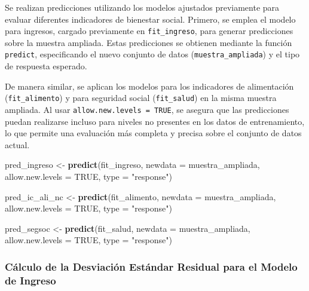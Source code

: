 \documentclass[
  12pt,
]{book}
\newenvironment{Shaded}{\begin{snugshade}}{\end{snugshade}}
\newcommand{\AttributeTok}[1]{\textcolor[rgb]{0.13,0.29,0.53}{#1}}
\newcommand{\ConstantTok}[1]{\textcolor[rgb]{0.56,0.35,0.01}{#1}}
\newcommand{\FunctionTok}[1]{\textcolor[rgb]{0.13,0.29,0.53}{\textbf{#1}}}
\newcommand{\NormalTok}[1]{#1}
\newcommand{\OtherTok}[1]{\textcolor[rgb]{0.56,0.35,0.01}{#1}}
\newcommand{\StringTok}[1]{\textcolor[rgb]{0.31,0.60,0.02}{#1}}
\begin{document}
Se realizan predicciones utilizando los modelos ajustados previamente para evaluar diferentes indicadores de bienestar social. Primero, se emplea el modelo para ingresos, cargado previamente en \texttt{fit\_ingreso}, para generar predicciones sobre la muestra ampliada. Estas predicciones se obtienen mediante la función \texttt{predict}, especificando el nuevo conjunto de datos (\texttt{muestra\_ampliada}) y el tipo de respuesta esperado.

De manera similar, se aplican los modelos para los indicadores de alimentación (\texttt{fit\_alimento}) y para seguridad social (\texttt{fit\_salud}) en la misma muestra ampliada. Al usar \texttt{allow.new.levels\ =\ TRUE}, se asegura que las predicciones puedan realizarse incluso para niveles no presentes en los datos de entrenamiento, lo que permite una evaluación más completa y precisa sobre el conjunto de datos actual.

\begin{Shaded}
\begin{Highlighting}[]
\NormalTok{pred\_ingreso }\OtherTok{\textless{}{-}} \FunctionTok{predict}\NormalTok{(fit\_ingreso, }
                        \AttributeTok{newdata =}\NormalTok{ muestra\_ampliada,}
                        \AttributeTok{allow.new.levels =} \ConstantTok{TRUE}\NormalTok{, }
                        \AttributeTok{type =} \StringTok{"response"}\NormalTok{)}

\NormalTok{pred\_ic\_ali\_nc }\OtherTok{\textless{}{-}} \FunctionTok{predict}\NormalTok{(fit\_alimento, }
                        \AttributeTok{newdata =}\NormalTok{ muestra\_ampliada,}
                        \AttributeTok{allow.new.levels =} \ConstantTok{TRUE}\NormalTok{, }
                        \AttributeTok{type =} \StringTok{"response"}\NormalTok{)}

\NormalTok{pred\_segsoc }\OtherTok{\textless{}{-}} \FunctionTok{predict}\NormalTok{(fit\_salud, }
                        \AttributeTok{newdata =}\NormalTok{ muestra\_ampliada,}
                       \AttributeTok{allow.new.levels =} \ConstantTok{TRUE}\NormalTok{, }
                       \AttributeTok{type =} \StringTok{"response"}\NormalTok{)}
\end{Highlighting}
\end{Shaded}

\hypertarget{cuxe1lculo-de-la-desviaciuxf3n-estuxe1ndar-residual-para-el-modelo-de-ingreso}{%
\subsubsection*{Cálculo de la Desviación Estándar Residual para el Modelo de Ingreso}\label{cuxe1lculo-de-la-desviaciuxf3n-estuxe1ndar-residual-para-el-modelo-de-ingreso}}
\end{document}

